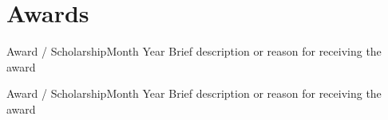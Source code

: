 \section{Awards}

\resumeSubHeadingListStart

    \resumeSubheading
        {Award / Scholarship}{Month Year}
        {Brief description or reason for receiving the award}{}

    \resumeSubheading
        {Award / Scholarship}{Month Year}
        {Brief description or reason for receiving the award}{}

\resumeSubHeadingListEnd